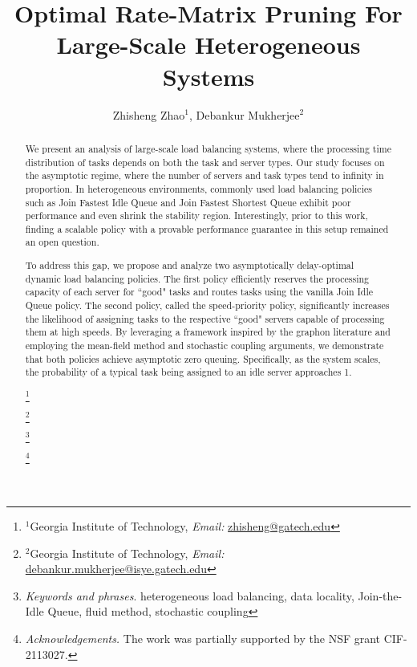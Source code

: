 \documentclass[11pt, reqno]{article}
\title{Optimal Rate-Matrix Pruning For Large-Scale Heterogeneous Systems}
\numberwithin{equation}{section}
\numberwithin{theorem}{section}
\newcommand\blfootnote[1]{%
  \begingroup
  \renewcommand\thefootnote{}\footnote{#1}%
  \addtocounter{footnote}{-1}%
  \endgroup
}
\begin{document}
\author{
  Zhisheng Zhao$^1$, Debankur Mukherjee$^2$
}
\renewcommand\Authands{, }
\maketitle
\begin{abstract}
We present an analysis of large-scale load balancing systems, where the processing time distribution of tasks depends on both the task and server types. Our study focuses on the asymptotic regime, where the number of servers and task types tend to infinity in proportion.
In heterogeneous environments, commonly used load balancing policies such as Join Fastest Idle Queue and Join Fastest Shortest Queue exhibit poor performance and even shrink the stability region. Interestingly, prior to this work, finding a scalable policy with a provable performance guarantee in this setup remained an open question.

To address this gap, we propose and analyze two asymptotically delay-optimal dynamic load balancing policies. The first policy efficiently reserves the processing capacity of each server for ``good" tasks and routes tasks using the vanilla Join Idle Queue policy. The second policy, called the speed-priority policy, significantly increases the likelihood of assigning tasks to the respective ``good" servers capable of processing them at high speeds.
By leveraging a framework inspired by the graphon literature and employing the mean-field method and stochastic coupling arguments, we demonstrate that both policies achieve asymptotic zero queuing. Specifically, as the system scales, the probability of a typical task being assigned to an idle server approaches 1.

   \blfootnote{$^1$Georgia Institute of Technology, \emph{Email:} \href{mailto:zhisheng@gatech.edu}{zhisheng@gatech.edu}}
\blfootnote{$^2$Georgia Institute of Technology, \emph{Email:}  \href{mailto:debankur.mukherjee@isye.gatech.edu}{debankur.mukherjee@isye.gatech.edu}}
\blfootnote{\emph{Keywords and phrases}. heterogeneous load balancing, data locality, Join-the-Idle Queue, fluid method, stochastic coupling }
\blfootnote{\emph{Acknowledgements.} The work was partially supported by the NSF grant CIF-2113027.}
\end{abstract}
\end{document}
